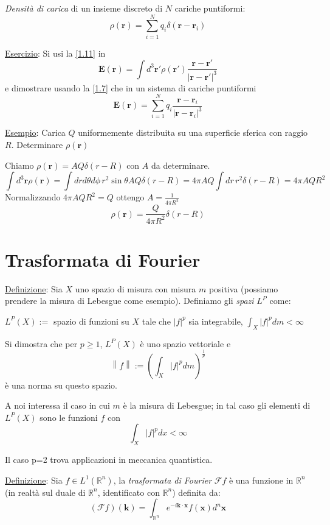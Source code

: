\documentclass[a4paper,11pt]{report}
\newcommand{\vect}[1]{\boldsymbol{#1}}
\newcommand{\R}{\mathbb{R}}
\newcommand{\Rn}{\mathbb{R}^n}
\begin{document}
\medskip

\emph{Densit\`a di carica} di un insieme discreto di $N$ cariche puntiformi:
\begin{equation}
\rho(\vect{r}) = \sum_{i=1}^{N} q_i\delta(\vect{r}-\vect{r}_i)
\label{1.11}
\end{equation}

\underline{Esercizio}: Si usi la \eqref{1.11} in
\[
\vect{E}(\vect{r})=\int d^3\vect{r}'\rho(\vect{r}')\frac{\vect{r}-\vect{r}'}{|\vect{r}-\vect{r}'|^3}
\]
e dimostrare usando la \eqref{1.7} che in un sistema di cariche puntiformi
\[
\vect{E}(\vect{r})= \sum_{i=1}^{N} q_i\frac{\vect{r}-\vect{r}_i}{|\vect{r}-\vect{r}_i|^3}
\]

\underline{Esempio}: Carica $Q$ uniformemente distribuita su una superficie sferica con raggio $R$. 
Determinare $\rho(\vect{r})$

Chiamo $\rho(\vect{r})=A Q\delta(r-R)$ con $A$ da determinare.
\[
\int d^3\vect{r}\rho(\vect{r})= \int dr d\theta d\phi \, r^2 \sin\theta  A Q \delta(r-R) = 4\pi AQ \int dr \, r^2 \delta(r-R)=4\pi AQR^2
\]
Normalizzando $4\pi AQR^2 =Q$ ottengo $A=\frac{1}{4\pi R^2}$
\[
\rho(\vect{r})=\frac{Q}{4\pi R^2}\delta(r-R)
\]

\section{Trasformata di Fourier}

\underline{Definizione}: 
Sia $X$ uno spazio di misura con misura $m$ positiva (possiamo prendere la misura di Lebesgue come esempio).
Definiamo gli \emph{spazi} $L^P$ come:

$L^P(X):=$ spazio di funzioni su $X$ tale che $|f|^p$ sia integrabile, $\int_{X}|f|^p dm < \infty$

Si dimostra che per $p\geq1$, $L^P(X)$ \`e uno spazio vettoriale e 
\[
\left\|f\right\| := \left( \int_{X} |f|^p dm\right)^{\frac{1}{p}}
\]
\`e una norma su questo spazio.

A noi interessa il caso in cui $m$ \`e la misura di Lebesgue; in tal caso gli elementi di $L^P(X)$ sono le funzioni $f$ con 
\[
\int_{X}|f|^p dx < \infty
\]

Il caso p=2 trova applicazioni in meccanica quantistica.

\medskip

\underline{Definizione}: Sia $f\in L^1 (\Rn)$, la \emph{trasformata di Fourier} $\mathcal{F}f$ \`e una funzione in $\Rn$ (in realt\`a sul duale di $\R^n$, identificato con $\R^n$) definita da:
\begin{equation}
\left( \mathcal{F} f\right)(\vect{k}) = \int_{\Rn}e^{-i\vect{k}\cdot\vect{x}}f(\vect{x})d^n\vect{x} 
\end{equation}
\end{document}
